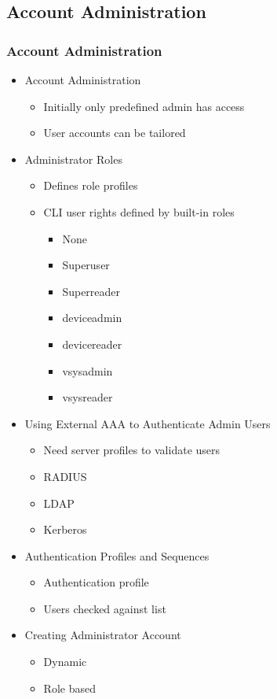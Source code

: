 \subsection{Account Administration}
\subsubsection{Account Administration}
    \begin{itemize}
        \item Account Administration
            \begin{itemize}
                \item Initially only predefined admin has access
                \item User accounts can be tailored
            \end{itemize}
        \item Administrator Roles
            \begin{itemize}
                \item Defines role profiles
                \item CLI user rights defined by built-in roles
                    \begin{itemize}
                        \item None
                        \item Superuser
                        \item Superreader
                        \item deviceadmin
                        \item devicereader
                        \item vsysadmin
                        \item vsysreader
                    \end{itemize}
            \end{itemize}
        \item Using External AAA to Authenticate Admin Users
            \begin{itemize}
                \item Need server profiles to validate users
                \item RADIUS
                \item LDAP
                \item Kerberos
            \end{itemize}
        \item Authentication Profiles and Sequences
            \begin{itemize}
                \item Authentication profile
                \item Users checked against list
            \end{itemize}
        \item Creating Administrator Account
            \begin{itemize}
                \item Dynamic
                \item Role based
            \end{itemize}
    \end{itemize}
    
